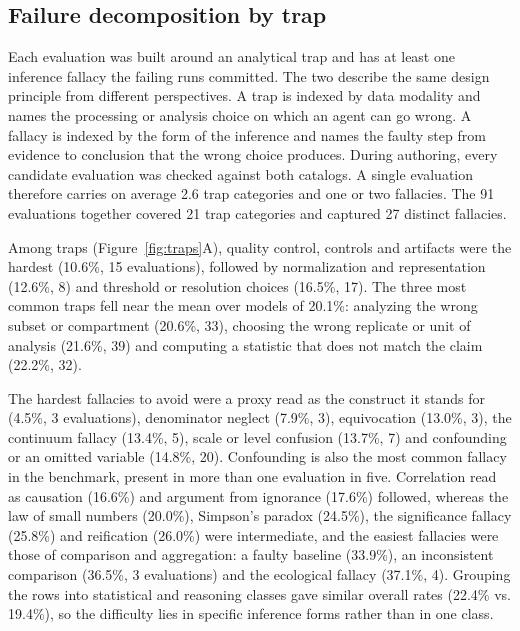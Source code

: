 \subsection*{Failure decomposition by trap}

Each evaluation was built around an analytical trap and has at least one inference fallacy the failing runs committed. The two describe the same design principle from different perspectives. A trap is indexed by data modality and names the processing or analysis choice on which an agent can go wrong. A fallacy is indexed by the form of the inference and names the faulty step from evidence to conclusion that the wrong choice produces. During authoring, every candidate evaluation was checked against both catalogs. A single evaluation therefore carries on average 2.6 trap categories and one or two fallacies. The 91 evaluations together covered 21 trap categories and captured 27 distinct fallacies.

Among traps (Figure~\ref{fig:traps}A), quality control, controls and artifacts were the hardest (10.6\%, 15 evaluations), followed by normalization and representation (12.6\%, 8) and threshold or resolution choices (16.5\%, 17). The three most common traps fell near the mean over models of 20.1\%: analyzing the wrong subset or compartment (20.6\%, 33), choosing the wrong replicate or unit of analysis (21.6\%, 39) and computing a statistic that does not match the claim (22.2\%, 32).

The hardest fallacies to avoid were a proxy read as the construct it stands for (4.5\%, 3 evaluations), denominator neglect (7.9\%, 3), equivocation (13.0\%, 3), the continuum fallacy (13.4\%, 5), scale or level confusion (13.7\%, 7) and confounding or an omitted variable (14.8\%, 20). Confounding is also the most common fallacy in the benchmark, present in more than one evaluation in five. Correlation read as causation (16.6\%) and argument from ignorance (17.6\%) followed, whereas the law of small numbers (20.0\%), Simpson's paradox (24.5\%), the significance fallacy (25.8\%) and reification (26.0\%) were intermediate, and the easiest fallacies were those of comparison and aggregation: a faulty baseline (33.9\%), an inconsistent comparison (36.5\%, 3 evaluations) and the ecological fallacy (37.1\%, 4). Grouping the rows into statistical and reasoning classes gave similar overall rates (22.4\% vs. 19.4\%), so the difficulty lies in specific inference forms rather than in one class.
